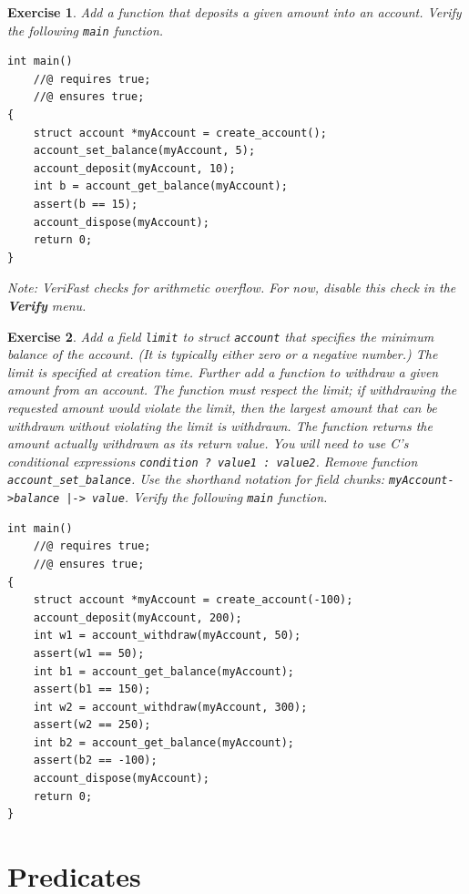 \documentclass{article}
\newtheorem{exercise}{Exercise}
\begin{document}
\begin{exercise}\label{exercise:deposit}
Add a function that deposits a given amount into an account.
Verify the following \lstinline!main! function.
\begin{lstlisting}[basicstyle=\ttfamily\upshape]
int main()
    //@ requires true;
    //@ ensures true;
{
    struct account *myAccount = create_account();
    account_set_balance(myAccount, 5);
    account_deposit(myAccount, 10);
    int b = account_get_balance(myAccount);
    assert(b == 15);
    account_dispose(myAccount);
    return 0;
}
\end{lstlisting}
Note: VeriFast checks for arithmetic overflow. For now, disable
this check in the \textbf{Verify} menu.
\end{exercise}

\begin{exercise}\label{exercise:limit}
Add a field \lstinline!limit! to struct \lstinline!account! that specifies the minimum balance of the account. (It is typically either zero or a negative number.)
The limit is specified at creation time. Further add a function
to withdraw a given amount from an account. The function must
respect the limit; if withdrawing the requested amount would violate the limit, then the largest amount that can be withdrawn without violating the limit is withdrawn. The function
returns the amount actually withdrawn as its return value. You
will need to use C's conditional expressions
\lstinline!condition ? value1 : value2!. Remove function
\lstinline!account_set_balance!. Use the shorthand notation for
field chunks: \lstinline!myAccount->balance |-> value!. Verify
the following \lstinline!main! function.
\begin{lstlisting}[basicstyle=\ttfamily\upshape]
int main()
    //@ requires true;
    //@ ensures true;
{
    struct account *myAccount = create_account(-100);
    account_deposit(myAccount, 200);
    int w1 = account_withdraw(myAccount, 50);
    assert(w1 == 50);
    int b1 = account_get_balance(myAccount);
    assert(b1 == 150);
    int w2 = account_withdraw(myAccount, 300);
    assert(w2 == 250);
    int b2 = account_get_balance(myAccount);
    assert(b2 == -100);
    account_dispose(myAccount);
    return 0;
}
\end{lstlisting}
\end{exercise}

\section{Predicates}
\end{document}
